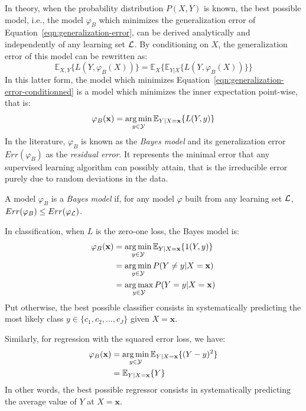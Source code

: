 In theory, when the probability distribution $P(X, Y)$ is known, the best possible model,
i.e., the model $\varphi_B$ which minimizes the generalization error of
Equation~\ref{eqn:generalization-error}, can be derived analytically and
independently of any learning set ${\cal L}$.
By conditioning on $X$, the generalization error of this model can be rewritten as:
\begin{equation}\label{eqn:generalization-error-conditionned}
\mathbb{E}_{X, Y}\{ L(Y, \varphi_B(X)) \} = \mathbb{E}_{X}\{ \mathbb{E}_{Y|X} \{ L(Y, \varphi_B(X)) \} \}
\end{equation}
In this latter form, the model which minimizes
Equation~\ref{eqn:generalization-error-conditionned} is a model which
minimizes the inner expectation point-wise, that is:
\begin{equation}
\varphi_B(\mathbf{x}) = \operatorname*{arg\,min}_{y \in {\cal Y}} \mathbb{E}_{Y|X=\mathbf{x}} \{ L(Y, y) \}
\end{equation}
In the literature, $\varphi_B$ is known as the \textit{Bayes model} and its
generalization error $Err(\varphi_B)$ as the \textit{residual error}. It represents the minimal
error that any supervised learning algorithm can possibly attain, that is
the irreducible error purely due to random deviations in the data.

\begin{definition}
A model $\varphi_B$ is a \emph{Bayes model} if, for any model $\varphi$ built from any
learning set ${\cal L}$, $Err(\varphi_B) \leq Err(\varphi_{\cal L})$.
\end{definition}

In classification, when $L$ is the zero-one loss, the Bayes model is:
\begin{align}
\varphi_B(\mathbf{x}) &= \operatorname*{arg\,min}_{y \in {\cal Y}} \mathbb{E}_{Y|X=\mathbf{x}} \{ 1(Y, y) \} \nonumber \\
                      &= \operatorname*{arg\,min}_{y \in {\cal Y}} P(Y \neq y|X=\mathbf{x}) \nonumber \\
                      &= \operatorname*{arg\,max}_{y \in {\cal Y}} P(Y = y|X=\mathbf{x}) \label{eqn:bayes-model-classification}
\end{align}
Put otherwise, the best possible classifier
consists in systematically predicting the most likely class $y \in \{c_1, c_2, ..., c_J\}$
given $X=\mathbf{x}$.

Similarly, for regression with the squared error loss, we have:
\begin{align}
\varphi_B(\mathbf{x}) &= \operatorname*{arg\,min}_{y \in {\cal Y}} \mathbb{E}_{Y|X=\mathbf{x}} \{ (Y - y)^2 \} \nonumber \\
                      &= \mathbb{E}_{Y|X=\mathbf{x}} \{ Y \} \label{eqn:bayes-model-regression}
\end{align}
In other words, the best possible regressor consists in systematically predicting
the average value of $Y$ at $X=\mathbf{x}$.

